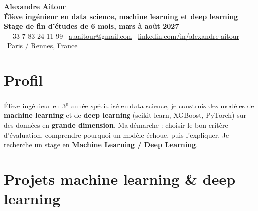 \documentclass[10pt,a4paper]{article}
\newcommand{\sep}{\hspace{0.7em}{\color{soft}|}\hspace{0.7em}}
\begin{document}
\begin{center}
  {\fontsize{24}{28}\selectfont\bfseries Alexandre Aitour}\\[4pt]
  {\color{accent}\bfseries Élève ingénieur en data science, machine learning et deep learning \sep
   Stage de fin d'études de 6 mois, mars à août 2027}\\[5pt]
  {\small
    \faPhone\ +33 7 83 24 11 99 \sep
    \faEnvelope\ \href{mailto:a.aaitour@gmail.com}{a.aaitour@gmail.com} \sep
    \faLinkedin\ \href{https://www.linkedin.com/in/alexandre-aitour-a97168268/}{linkedin.com/in/alexandre-aitour} \sep
    \faMapMarker*\ Paris / Rennes, France}
\end{center}

\section{Profil}
Élève ingénieur en 3\textsuperscript{e} année spécialisé en data science, je construis des modèles de \textbf{machine learning}
et de \textbf{deep learning} (scikit-learn, XGBoost, PyTorch) sur des données en \textbf{grande dimension}. Ma démarche :
choisir le bon critère d'évaluation, comprendre pourquoi un modèle échoue, puis l'expliquer. Je recherche un stage en
\textbf{Machine Learning / Deep Learning}.

\section{Projets machine learning \& deep learning}
\end{document}
